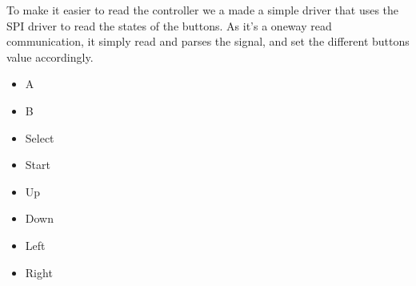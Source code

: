 To make it easier to read the controller we a made a simple driver that uses the SPI driver to read the states of the buttons. As it's a oneway read communication, it simply read and parses the signal, and set the different buttons value accordingly.


\begin{itemize}
\item A
\item B
\item Select
\item Start
\item Up
\item Down
\item Left
\item Right
\end{itemize}
